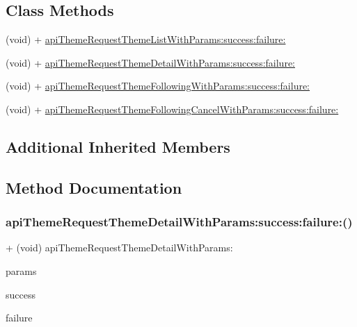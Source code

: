 \subsection*{Class Methods}
\begin{DoxyCompactItemize}
\item 
(void) + \mbox{\hyperlink{interface_j_m_theme_street_a_p_i_tool_a4f9ffd7be9460f6ca8ccf11ef143f627}{api\+Theme\+Request\+Theme\+List\+With\+Params\+:success\+:failure\+:}}
\item 
(void) + \mbox{\hyperlink{interface_j_m_theme_street_a_p_i_tool_ae01b88a76ed3c16d4567fd6703352bd9}{api\+Theme\+Request\+Theme\+Detail\+With\+Params\+:success\+:failure\+:}}
\item 
(void) + \mbox{\hyperlink{interface_j_m_theme_street_a_p_i_tool_abeb10df61208e3b6b6b05329080bee58}{api\+Theme\+Request\+Theme\+Following\+With\+Params\+:success\+:failure\+:}}
\item 
(void) + \mbox{\hyperlink{interface_j_m_theme_street_a_p_i_tool_a063f8abd59fa67a2689aacde8e0491de}{api\+Theme\+Request\+Theme\+Following\+Cancel\+With\+Params\+:success\+:failure\+:}}
\end{DoxyCompactItemize}
\subsection*{Additional Inherited Members}


\subsection{Method Documentation}
\mbox{\label{interface_j_m_theme_street_a_p_i_tool_ae01b88a76ed3c16d4567fd6703352bd9}} 
\subsubsection{\texorpdfstring{api\+Theme\+Request\+Theme\+Detail\+With\+Params\+:success\+:failure\+:()}{apiThemeRequestThemeDetailWithParams:success:failure:()}}
{\footnotesize\ttfamily + (void) api\+Theme\+Request\+Theme\+Detail\+With\+Params\+: \begin{DoxyParamCaption}\item[{(N\+S\+Mutable\+Dictionary $\ast$)}]{params }\item[{success:(Request\+Success)}]{success }\item[{failure:(Request\+Failure)}]{failure }\end{DoxyParamCaption}}

